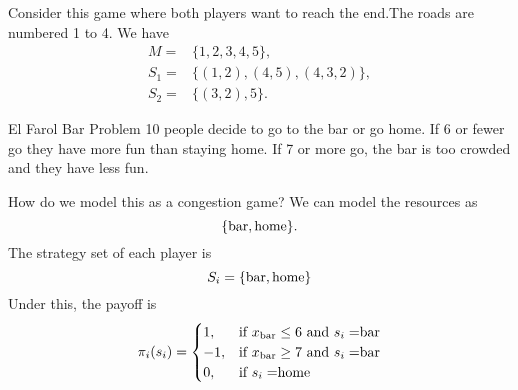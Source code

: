 \begin{aexample}{}{}
    
\begin{center}
    \end{center}

Consider this game where both players want to reach the end.The roads are numbered 1 to 4. We have \begin{align*}
    M=&\{1,2,3,4,5\},\\
    S_1=&\{(1,2),(4,5),(4,3,2)\},\\
    S_2=&\{(3,2),5\}.
\end{align*}

\end{aexample}
\begin{aexample}{El Farol Bar Problem}{}
    10 people decide to go to the bar or go home. 
    If 6 or fewer go they have more fun than staying home. If 7 or more go, the bar is too crowded and they have less fun.
\end{aexample}
How do we model this as a congestion game?
We can model the resources as \[
\{\rm{bar}, \rm{home}\}.
\]
The strategy set of each player is \[
S_i=\{\rm{bar},\rm{home}\}
\]
Under this, the payoff is\[
\pi_i(s_i)=\begin{cases}
    1,&\textrm{if $x_{\rm{bar}}\leq 6$ and $s_i=$bar}\\-1,&\textrm{if $x_{\rm{bar}}\geq 7$ and $s_i=$bar}\\
    0,&\textrm{if $s_i=$home}\\
\end{cases}
\]
